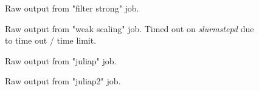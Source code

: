 \documentclass[a4paper,%
7pt,%
DIV12,
headsepline,%
headings=normal,
]{scrartcl}
\begin{document}
\begin{figure}[htbp]
    \centering
    \label{tab:filter_strong}
    \caption{Raw output from "filter strong" job.}
\end{figure}

\begin{figure}[htbp]
    \centering
    \label{tab:filter_weak}
    \caption{Raw output from "weak scaling" job. Timed out on \textit{slurmstepd} due to time out / time limit.}
\end{figure}

\begin{figure}[htbp]
    \centering
    \label{tab:juliap}
    \caption{Raw output from "juliap" job.}
\end{figure}

\begin{figure}[htbp]
    \centering
    \label{tab:juliap2}
    \caption{Raw output from "juliap2" job.}
\end{figure}
\end{document}
